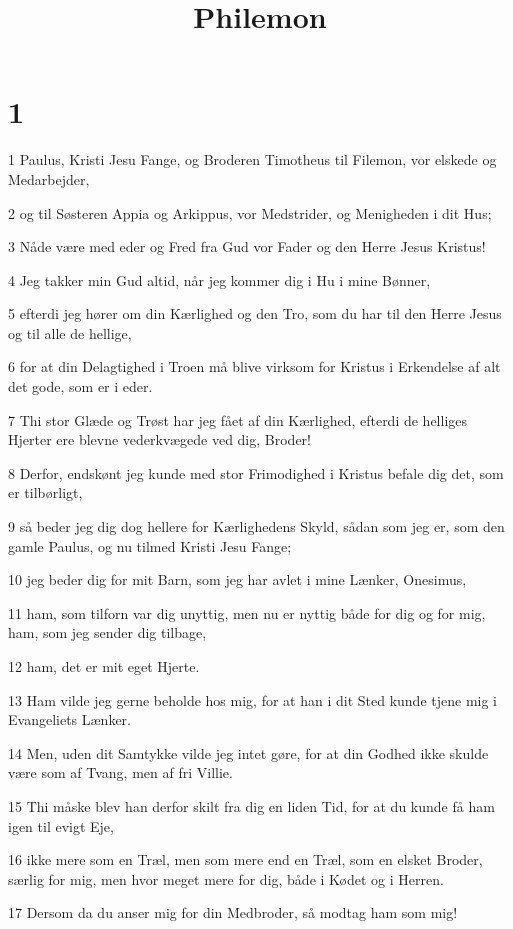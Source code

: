 

\title{Philemon}


\chapter{1}

\par 1 Paulus, Kristi Jesu Fange, og Broderen Timotheus til Filemon, vor elskede og Medarbejder,
\par 2 og til Søsteren Appia og Arkippus, vor Medstrider, og Menigheden i dit Hus;
\par 3 Nåde være med eder og Fred fra Gud vor Fader og den Herre Jesus Kristus!
\par 4 Jeg takker min Gud altid, når jeg kommer dig i Hu i mine Bønner,
\par 5 efterdi jeg hører om din Kærlighed og den Tro, som du har til den Herre Jesus og til alle de hellige,
\par 6 for at din Delagtighed i Troen må blive virksom for Kristus i Erkendelse af alt det gode, som er i eder.
\par 7 Thi stor Glæde og Trøst har jeg fået af din Kærlighed, efterdi de helliges Hjerter ere blevne vederkvægede ved dig, Broder!
\par 8 Derfor, endskønt jeg kunde med stor Frimodighed i Kristus befale dig det, som er tilbørligt,
\par 9 så beder jeg dig dog hellere for Kærlighedens Skyld, sådan som jeg er, som den gamle Paulus, og nu tilmed Kristi Jesu Fange;
\par 10 jeg beder dig for mit Barn, som jeg har avlet i mine Lænker, Onesimus,
\par 11 ham, som tilforn var dig unyttig, men nu er nyttig både for dig og for mig, ham, som jeg sender dig tilbage,
\par 12 ham, det er mit eget Hjerte.
\par 13 Ham vilde jeg gerne beholde hos mig, for at han i dit Sted kunde tjene mig i Evangeliets Lænker.
\par 14 Men, uden dit Samtykke vilde jeg intet gøre, for at din Godhed ikke skulde være som af Tvang, men af fri Villie.
\par 15 Thi måske blev han derfor skilt fra dig en liden Tid, for at du kunde få ham igen til evigt Eje,
\par 16 ikke mere som en Træl, men som mere end en Træl, som en elsket Broder, særlig for mig, men hvor meget mere for dig, både i Kødet og i Herren.
\par 17 Dersom da du anser mig for din Medbroder, så modtag ham som mig!
